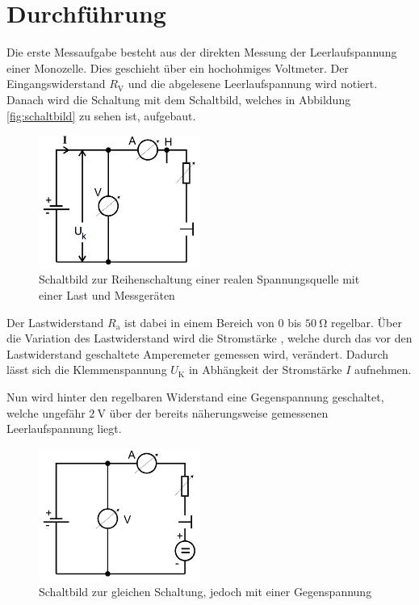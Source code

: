 \section{Durchführung}
\label{sec:Durchführung}

Die erste Messaufgabe besteht aus der direkten Messung der Leerlaufspannung einer
Monozelle. Dies geschieht über ein hochohmiges Voltmeter. Der Eingangswiderstand
$R_\text{V}$ und die abgelesene Leerlaufspannung wird notiert.
Danach wird die Schaltung mit dem Schaltbild, welches in Abbildung \ref{fig:schaltbild}
zu sehen ist, aufgebaut.

\begin{figure}
  \centering
  \includegraphics[width=150pt]{data/schaltbild1.png}
  \caption{Schaltbild zur Reihenschaltung einer realen Spannungsquelle mit einer Last und Messgeräten \cite{Versuchsanleitung}}
  \label{fig:schaltbild1}
\end{figure}

Der Lastwiderstand $R_\text{a}$ ist dabei in einem Bereich von $0$ bis
$\SI{50}{\ohm}$ regelbar. Über die Variation des Lastwiderstand wird die Stromstärke
, welche durch das vor den Lastwiderstand geschaltete Amperemeter gemessen wird,
verändert. Dadurch lässt sich die Klemmenspannung $U_\text{K}$ in Abhängkeit der
Stromstärke $I$ aufnehmen.

Nun wird hinter den regelbaren Widerstand eine Gegenspannung geschaltet, welche
ungefähr $\SI{2}{\volt}$ über der bereits näherungsweise gemessenen Leerlaufspannung
liegt.

\begin{figure}
  \centering
  \includegraphics[width=150pt]{data/schaltbild2.png}
  \caption{Schaltbild zur gleichen Schaltung, jedoch mit einer Gegenspannung \cite{Versuchsanleitung}}
  \label{fig:schaltbild2}
\end{figure}
